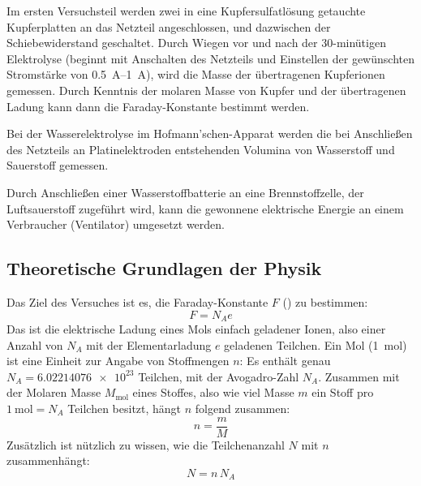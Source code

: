 Im ersten Versuchsteil werden zwei in eine Kupfersulfatlösung getauchte Kupferplatten an das Netzteil angeschlossen, und dazwischen der Schiebewiderstand geschaltet. Durch Wiegen vor und nach der 30-minütigen Elektrolyse (beginnt mit Anschalten des Netzteils und Einstellen der gewünschten Stromstärke von \qtyrange{0.5}{1}{\ampere}), wird die Masse der übertragenen Kupferionen gemessen. Durch Kenntnis der molaren Masse von Kupfer und der übertragenen Ladung kann dann die Faraday-Konstante bestimmt werden. 

Bei der Wasserelektrolyse im Hofmann'schen-Apparat werden die bei Anschließen des Netzteils an Platinelektroden entstehenden Volumina von Wasserstoff und Sauerstoff gemessen. 

Durch Anschließen einer Wasserstoffbatterie an eine Brennstoffzelle, der Luftsauerstoff zugeführt wird, kann die gewonnene elektrische Energie an einem Verbraucher (Ventilator) umgesetzt werden.  

\subsection{Theoretische Grundlagen der Physik}
Das Ziel des Versuches ist es, die Faraday-Konstante \(F\) (\autocite{Faraday}) zu bestimmen:
\begin{equation}
    F=N_A e
\end{equation}
Das ist die elektrische Ladung eines Mols einfach geladener Ionen, also einer Anzahl von \(N_A\) mit der Elementarladung \(e\) geladenen Teilchen. Ein Mol (\qty{1}{\mole}) ist eine Einheit zur Angabe von Stoffmengen \(n\): Es enthält genau \(N_A=\num{6.02214076e23}\) Teilchen, mit der Avogadro-Zahl \(N_A\). Zusammen mit der Molaren Masse \(M_{\text{mol}}\) eines Stoffes, also wie viel Masse \(m\) ein Stoff pro \(\qty{1}{\mole}=N_A\) Teilchen besitzt, hängt \(n\) folgend zusammen:
\begin{equation}
    n=\frac{m}{M}
\end{equation}
Zusätzlich ist nützlich zu wissen, wie die Teilchenanzahl \(N\) mit \(n\) zusammenhängt:
\begin{equation}
    N=n\,N_A
\end{equation}

